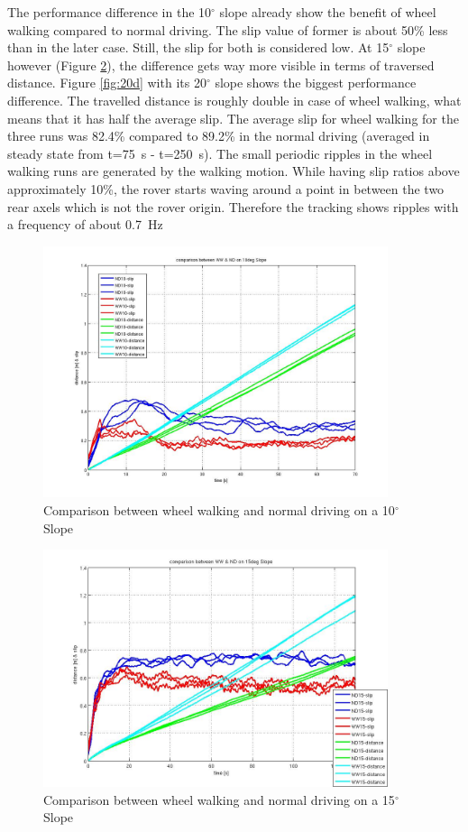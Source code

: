 \documentclass[a4paper,twocolumn]{esapub2005} %
\begin{document}
The performance difference in the 10$^\circ$ slope already show the benefit of
wheel walking compared to normal driving. The slip value of former is about
50\% less than in the later case. Still, the slip for both is considered low.
At 15$^\circ$ slope however (Figure \ref{fig:15d}), the difference gets way
more visible in terms of traversed distance.  Figure \ref{fig:20d} with its
20$^\circ$ slope shows the biggest performance difference. The travelled
distance is roughly double in case of wheel walking, what means that it has
half the average slip. The average slip for wheel walking for the three runs
was 82.4\% compared to 89.2\% in the normal driving (averaged in steady state
from t=75~\unit{s} - t=250~\unit{s}).  The small periodic ripples in the wheel
walking runs are generated by the walking motion. While having slip ratios
above approximately 10\%, the rover starts waving around a point in between the
two rear axels which is not the rover origin. Therefore the tracking shows
ripples with a frequency of about 0.7~\unit{Hz}

\begin{figure}[h!]
    \centering
    \includegraphics[width=0.9\textwidth]{10d.jpg}	\caption{Comparison between
    wheel walking and normal driving on a 10$^{\circ}$ Slope} \label{fig:10d}
\end{figure}

\begin{figure}[h!]
    \centering
    \includegraphics[width=0.9\textwidth]{15d.jpg}	\caption{Comparison between
    wheel walking and normal driving on a 15$^{\circ}$ Slope} \label{fig:15d}
\end{figure}
\end{document}
